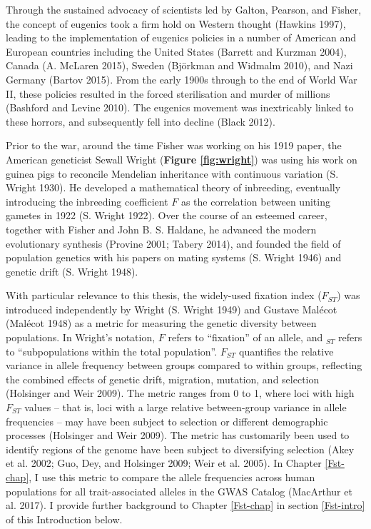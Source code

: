 \documentclass[
]{book}
\begin{document}
Through the sustained advocacy of scientists led by Galton, Pearson, and Fisher, the concept of eugenics took a firm hold on Western thought (Hawkins 1997), leading to the implementation of eugenics policies in a number of American and European countries including the United States (Barrett and Kurzman 2004), Canada (A. McLaren 2015), Sweden (Björkman and Widmalm 2010), and Nazi Germany (Bartov 2015). From the early 1900s through to the end of World War II, these policies resulted in the forced sterilisation and murder of millions (Bashford and Levine 2010). The eugenics movement was inextricably linked to these horrors, and subsequently fell into decline (Black 2012).

Prior to the war, around the time Fisher was working on his 1919 paper, the American geneticist Sewall Wright (\textbf{Figure \ref{fig:wright}}) was using his work on guinea pigs to reconcile Mendelian inheritance with continuous variation (S. Wright 1930). He developed a mathematical theory of inbreeding, eventually introducing the inbreeding coefficient \(F\) as the correlation between uniting gametes in 1922 (S. Wright 1922). Over the course of an esteemed career, together with Fisher and John B. S. Haldane, he advanced the modern evolutionary synthesis (Provine 2001; Tabery 2014), and founded the field of population genetics with his papers on mating systems (S. Wright 1946) and genetic drift (S. Wright 1948).

With particular relevance to this thesis, the widely-used fixation index (\(F_{ST}\)) was introduced independently by Wright (S. Wright 1949) and Gustave Malécot (Malécot 1948) as a metric for measuring the genetic diversity between populations. In Wright's notation, \(F\) refers to ``fixation'' of an allele, and \(_{ST}\) refers to ``subpopulations within the total population''. \(F_{ST}\) quantifies the relative variance in allele frequency between groups compared to within groups, reflecting the combined effects of genetic drift, migration, mutation, and selection (Holsinger and Weir 2009). The metric ranges from 0 to 1, where loci with high \(F_{ST}\) values -- that is, loci with a large relative between-group variance in allele frequencies -- may have been subject to selection or different demographic processes (Holsinger and Weir 2009). The metric has customarily been used to identify regions of the genome have been subject to diversifying selection (Akey et al. 2002; Guo, Dey, and Holsinger 2009; Weir et al. 2005). In Chapter \ref{Fst-chap}, I use this metric to compare the allele frequencies across human populations for all trait-associated alleles in the GWAS Catalog (MacArthur et al. 2017). I provide further background to Chapter \ref{Fst-chap} in section \ref{Fst-intro} of this Introduction below.
\end{document}
